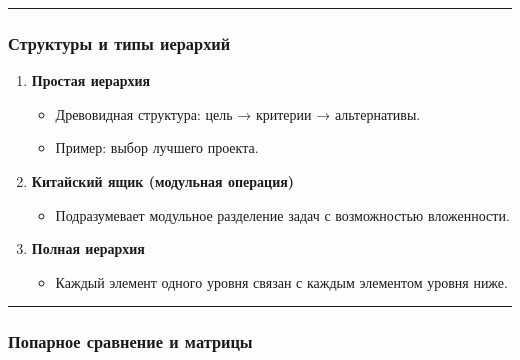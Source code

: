 \documentclass[
]{article}
\providecommand{\tightlist}{%
  \setlength{\itemsep}{0pt}\setlength{\parskip}{0pt}}
\begin{document}
\begin{center}\rule{0.5\linewidth}{0.5pt}\end{center}

\subsubsection{\texorpdfstring{\textbf{Структуры и типы
иерархий}}{Структуры и типы иерархий}}\label{ux441ux442ux440ux443ux43aux442ux443ux440ux44b-ux438-ux442ux438ux43fux44b-ux438ux435ux440ux430ux440ux445ux438ux439}

\begin{enumerate}
\def\labelenumi{\arabic{enumi}.}
\item
  \textbf{Простая иерархия}

  \begin{itemize}
  \tightlist
  \item
    Древовидная структура: цель → критерии → альтернативы.
  \item
    Пример: выбор лучшего проекта.
  \end{itemize}
\item
  \textbf{Китайский ящик (модульная операция)}

  \begin{itemize}
  \tightlist
  \item
    Подразумевает модульное разделение задач с возможностью вложенности.
  \end{itemize}
\item
  \textbf{Полная иерархия}

  \begin{itemize}
  \tightlist
  \item
    Каждый элемент одного уровня связан с каждым элементом уровня ниже.
  \end{itemize}
\end{enumerate}

\begin{center}\rule{0.5\linewidth}{0.5pt}\end{center}

\subsubsection{\texorpdfstring{\textbf{Попарное сравнение и
матрицы}}{Попарное сравнение и матрицы}}\label{ux43fux43eux43fux430ux440ux43dux43eux435-ux441ux440ux430ux432ux43dux435ux43dux438ux435-ux438-ux43cux430ux442ux440ux438ux446ux44b}
\end{document}
